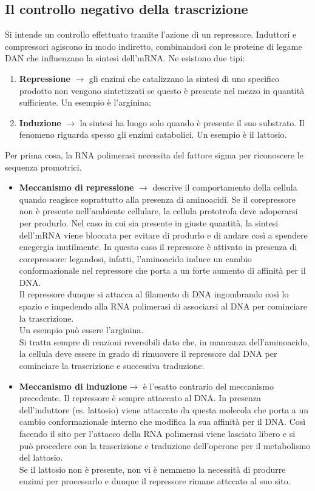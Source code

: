\subsection{Il controllo negativo della trascrizione}
Si intende un controllo effettuato tramite l'azione di un repressore. Induttori e compressori agiscono in modo indiretto, combinandosi con le proteine di legame DAN che influenzano la sintesi dell'mRNA. Ne esistono due tipi:
\begin{enumerate}
    \item \textbf{Repressione} $\xrightarrow{}$ gli enzimi che catalizzano la sintesi di uno specifico prodotto non vengono sintetizzati se questo è presente nel mezzo in quantità sufficiente. Un esempio è l'arginina; 
    \item \textbf{Induzione} $\xrightarrow{}$ la sintesi ha luogo solo quando è presente il suo substrato. Il fenomeno riguarda spesso gli enzimi catabolici. Un esempio è il lattosio. 
\end{enumerate}
Per prima cosa, la RNA polimerasi necessita del fattore sigma per riconoscere le sequenza promotrici. 
\begin{itemize}
    \item \textbf{Meccanismo di repressione} $\xrightarrow{}$ descrive il comportamento della cellula quando reagisce soprattutto alla presenza di aminoacidi. Se il corepressore non è presente nell'ambiente cellulare, la cellula prototrofa deve adoperarsi per produrlo. Nel caso in cui sia presente in giuste quantità, la sintesi dell'mRNA viene bloccata per evitare di produrlo e di andare così a spendere enegergia inutilmente. In questo caso il repressore è attivato in presenza di corepressore: legandosi, infatti, l'aminoacido induce un cambio conformazionale nel repressore che porta a un forte aumento di affinità per il DNA. 
    \\Il repressore dunque si attacca al filamento di DNA ingombrando così lo spazio e impedendo alla RNA polimerasi di associarsi al DNA per cominciare la trascrizione. 
    \\Un esempio può essere l'arginina.
    \\Si tratta sempre di reazioni reversibili dato che, in mancanza dell'aminoacido, la cellula deve essere in grado di rimuovere il repressore dal DNA per cominciare la trascrizione e successiva traduzione. 
    \item \textbf{Meccanismo di induzione}$\xrightarrow{}$ è l'esatto contrario del meccanismo precedente. Il repressore è sempre attaccato al DNA. In presenza dell'induttore (es. lattosio) viene attaccato da questa molecola che porta a un cambio conformazionale interno che modifica la sua affinità per il DNA. Così facendo il sito per l'attacco della RNA polimerasi viene lasciato libero e si può procedere con la trascrizione e traduzione dell'operone per il metabolismo del lattosio. 
    \\Se il lattosio non è presente, non vi è nemmeno la necessità di produrre enzimi per processarlo e dunque il repressore  rimane attccato al suo sito. 
\end{itemize}
